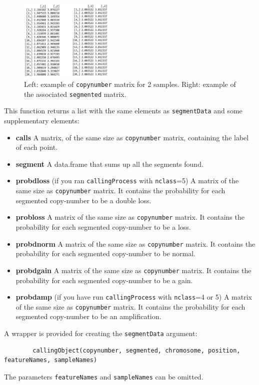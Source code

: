 \documentclass[a4paper,10pt]{article}
\begin{document}
		\begin{figure}[!h]
			\centering
			\includegraphics[width=0.4\textwidth]{fig/matrixlabel}
			\caption{Left: example of \texttt{copynumber} matrix for 2 samples. Right: example of the associated \texttt{segmented} matrix.}
		\end{figure}
		
		
		This function returns a list with the same elements as \texttt{segmentData} and some supplementary elements:
		\begin{itemize}
			\item \textbf{calls} A matrix, of the same size as \texttt{copynumber} matrix, containing the label of each point.
			\item \textbf{segment} A data.frame that sums up all the segments found.
			\item \textbf{probdloss} (if you ran \texttt{callingProcess} with \texttt{nclass}=5) A matrix of the same size as \texttt{copynumber} matrix. It contains the probability for each segmented copy-number to be a double loss.
			\item \textbf{probloss} A matrix of the same size as \texttt{copynumber} matrix. It contains the probability for each segmented copy-number to be a loss.
			\item \textbf{probdnorm} A matrix of the same size as \texttt{copynumber} matrix. It contains the probability for each segmented copy-number to be normal.
			\item \textbf{probdgain} A matrix of the same size as \texttt{copynumber} matrix. It contains the probability for each segmented copy-number to be a gain.
			\item \textbf{probdamp} (if you have run \texttt{callingProcess} with \texttt{nclass}=4 or 5) A matrix of the same size as \texttt{copynumber} matrix. It contains the probability for each segmented copy-number to be an amplification.

		\end{itemize}
		
		A wrapper is provided for creating the \texttt{segmentData} argument:
		\begin{verbatim}	
		callingObject(copynumber, segmented, chromosome, position, featureNames, sampleNames)
		\end{verbatim}
		The parameters \texttt{featureNames} and \texttt{sampleNames} can be omitted.		
		
\end{document}
